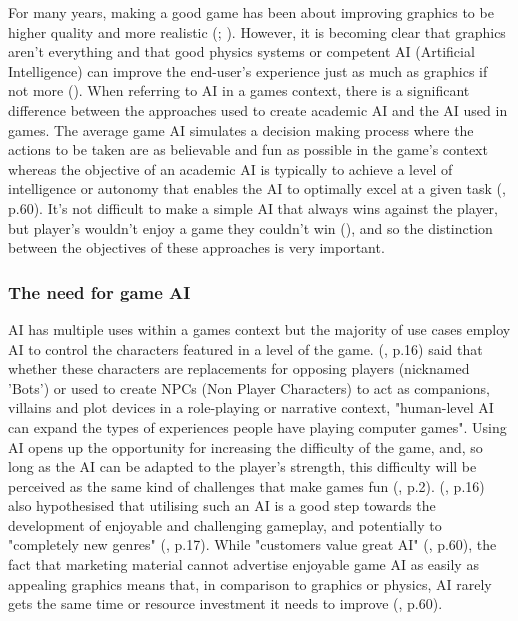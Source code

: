 \documentclass[11pt, a4paper]{article}
\begin{document}
For many years, making a good game has been about improving graphics to be higher quality and more realistic (\cite{yap2002grid}; \cite{blow2004game}). However, it is becoming clear that graphics aren't everything and that good physics systems or competent AI (Artificial Intelligence) can improve the end-user's experience just as much as graphics if not more (\cite{blow2004game}). When referring to AI in a games context, there is a significant difference between the approaches used to create academic AI and the AI used in games. The average game AI simulates a decision making process where the actions to be taken are as believable and fun as possible in the game's context whereas the objective of an academic AI is typically to achieve a level of intelligence or autonomy that enables the AI to optimally excel at a given task (\cite{nareyek2004ai}, p.60). It's not difficult to make a simple AI that always wins against the player, but player's wouldn't enjoy a game they couldn't win (\cite{tozour2002evolution}), and so the distinction between the objectives of these approaches is very important.

\subsubsection{The need for game AI}

AI has multiple uses within a games context but the majority of use cases employ AI to control the characters featured in a level of the game. \citeauthor{laird2001human} (\citeyear{laird2001human}, p.16) said that whether these characters are replacements for opposing players (nicknamed 'Bots') or used to create NPCs (Non Player Characters) to act as companions, villains and plot devices in a role-playing or narrative context, "human-level AI can expand the types of experiences people have playing computer games". Using AI opens up the opportunity for increasing the difficulty of the game, and, so long as the AI can be adapted to the player's strength, this difficulty will be perceived as the same kind of challenges that make games fun (\cite{buro2004call}, p.2). \citeauthor{laird2001human} (\citeyear{laird2001human}, p.16) also hypothesised that utilising such an AI is a good step towards the development of enjoyable and challenging gameplay, and potentially to "completely new genres" (\cite{laird2001human}, p.17). While "customers value great AI" (\cite{nareyek2004ai}, p.60), the fact that marketing material cannot advertise enjoyable game AI as easily as appealing graphics means that, in comparison to graphics or physics, AI rarely gets the same time or resource investment it needs to improve (\cite{nareyek2004ai}, p.60).
\end{document}
